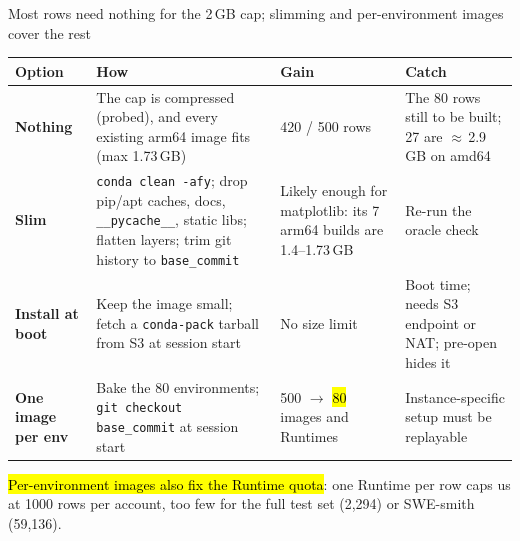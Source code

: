 \begin{frame}{Most rows need nothing for the 2\,GB cap; slimming and per-environment images cover the rest}
\scriptsize
\begin{tabularx}{\textwidth}{@{}>{\bfseries}p{2.2cm}Xp{2.4cm}X@{}}
\toprule
Option & How & Gain & Catch\\
\midrule
Nothing & The cap is compressed (probed), and every existing arm64 image fits (max 1.73\,GB) & 420 / 500 rows & The 80 rows still to be built; 27 are $\approx$\,2.9\,GB on amd64\\
Slim & \texttt{conda clean -afy}; drop pip/apt caches, docs, \texttt{\_\_pycache\_\_}, static libs; flatten layers; trim git history to \texttt{base\_commit} & Likely enough for matplotlib: its 7 arm64 builds are 1.4--1.73\,GB & Re-run the oracle check\\
Install at boot & Keep the image small; fetch a \texttt{conda-pack} tarball from S3 at session start & No size limit & Boot time; needs S3 endpoint or NAT; pre-open hides it\\
One image per env & Bake the 80 environments; \texttt{git checkout base\_commit} at session start & 500 $\rightarrow$ \hl{80} images and Runtimes & Instance-specific setup must be replayable\\
\bottomrule
\end{tabularx}
\par\vspace{3mm}
{\small\raggedright\hl{Per-environment images also fix the Runtime quota}: one Runtime per row caps us at 1000 rows per account, too few for the full test set (2,294) or SWE-smith (59,136).\par}
\end{frame}

